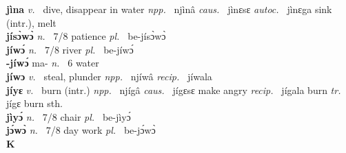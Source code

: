 {\bfseries jìna}  {\itshape v.~} dive, disappear in water   {\itshape npp.~} njìnâ {\itshape caus.~} jìnɛsɛ {\itshape autoc.~} jìnɛga sink (intr.), melt  \\ 
{\bfseries jísɔ̀wɔ̀}  {\itshape n.~} 7/8 patience {\itshape pl.~} be-jísɔ̀wɔ̀   \\ 
{\bfseries jíwɔ́}  {\itshape n.~} 7/8 river {\itshape pl.~} be-jíwɔ́    \\ 
{\bfseries -jíwɔ́} ma- {\itshape n.~} 6 water    \\ 
{\bfseries jíwɔ}  {\itshape v.~} steal, plunder   {\itshape npp.~} njíwâ {\itshape recip.~} jíwala  \\ 
{\bfseries jíyɛ}  {\itshape v.~} burn (intr.)   {\itshape npp.~} njígâ {\itshape caus.~} jígɛsɛ make angry {\itshape recip.~} jígala burn {\itshape tr.~} jígɛ burn sth. \\ 
{\bfseries jìyɔ́}  {\itshape n.~} 7/8 chair {\itshape pl.~} be-jìyɔ́    \\ 
{\bfseries jɔ́wɔ̀}  {\itshape n.~} 7/8 day work {\itshape pl.~} be-jɔ́wɔ̀    \\ 

\medskip
\noindent \large {\bfseries K}\normalsize\\
\medskip

